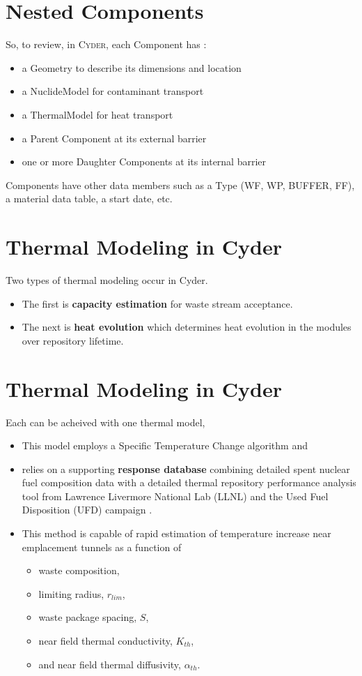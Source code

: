 \documentclass[letterpaper]{article}
\newcommand{\Cyder}{\textsc{Cyder}\xspace}
\begin{document}
\section{Nested Components}
So, to review, in \Cyder , each Component has : 
  \begin{itemize}
    \item a Geometry to describe its dimensions and location
    \item a NuclideModel for contaminant transport 
    \item a ThermalModel for heat transport
    \item a Parent Component at its external barrier
    \item one or more Daughter Components at its internal barrier
  \end{itemize}

  Components have other data members such as a Type (WF, WP, BUFFER, FF), a 
  material data table, a start date, etc. 

\section{Thermal Modeling in Cyder}
Two types of thermal modeling occur in Cyder. 
\begin{itemize}
\item The first is \textbf{capacity estimation} for waste stream acceptance.
\item The next is \textbf{heat evolution} which determines heat evolution in 
the modules over repository lifetime.
\end{itemize}

\section{Thermal Modeling in Cyder}
Each can be acheived with one thermal model,
\begin{itemize}
\item This model employs a Specific Temperature Change algorithm \cite{radel_effect_2007, radel_repository_2007} and
\item relies on a supporting \textbf{response database} combining detailed 
spent nuclear fuel composition data \cite{carter_fuel_2011} with a detailed 
thermal repository performance analysis tool from Lawrence Livermore National 
Lab (LLNL) and the Used Fuel Disposition (UFD) 
campaign \cite{greenberg_application_2012}.  
\item This method is capable of rapid estimation of temperature increase near emplacement tunnels as a function of 
\begin{itemize}
\item waste composition,
\item limiting radius, $r_{lim}$, 
\item waste package spacing, $S$, 
\item near field thermal conductivity, $K_{th}$, 
\item and near field thermal diffusivity, $\alpha_{th}$.
\end{itemize}
\end{itemize}
\end{document}

